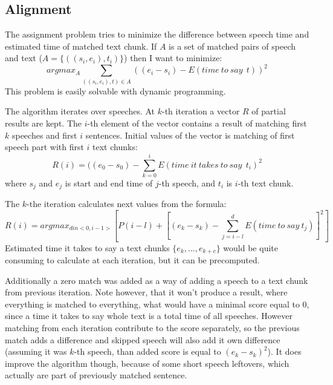 \documentclass[12pt,a4paper,english]{article}
\begin{document}
\newpage

\subsection{Alignment}

The assignment problem tries to minimize the difference between speech time and estimated time of matched text chunk.
If $A$ is a set of matched pairs of speech and text ($A = \{((s_i, e_i), t_i)\}$) then I want to minimize:
\begin{equation}
    argmax_A \sum_{((s_i, e_i), t) \in A} ((e_i - s_i) - E(time \: to \: say \: \: t))^2
\end{equation}
This problem is easily solvable with dynamic programming. \newline

The algorithm iterates over speeches. \newline
At $k$-th iteration a vector $R$ of partial results are kept. The $i$-th element of the vector contains a result of matching first $k$ speeches and first $i$ sentences. \newline
Initial values of the vector is matching of first speech part with first $i$ text chunks:
\begin{equation}
    R(i) = ((e_0 - s_0) - \sum_{k = 0}^i E(time \: it \: takes \: to \: say \: \: t_i)^2
\end{equation}
where $s_j$ and $e_j$ is start and end time of $j$-th speech, \newline
and $t_i$ is $i$-th text chunk. \newline
               
The $k$-the iteration calculates next values from the formula:
\begin{equation}
    R(i) = argmax_{d in <0, i - 1>} [P(i-l) + [(e_k - s_k) - \sum_{j = i - l}^d E(time \: to \: say \: t_j)]^2 ]
\end{equation}
Estimated time it takes to say a text chunks $\{e_k, ..., e_{k+c}\}$ would be quite consuming to calculate at each iteration, but it can be precomputed. \newline

Additionally a zero match was added as a way of adding a speech to a text chunk from previous iteration.  Note however, that it won't produce a result, where everything is matched to everything, what would have a minimal score equal to 0, since a time it takes to say whole text is a total time of all speeches. \newline
However matching from each iteration contribute to the score separately, so the previous match adds a difference and skipped speech will also add it own difference (assuming it was $k$-th speech, than added score is equal to $(e_k - s_k)^2$). \newline
It does improve the algorithm though, because of some short speech leftovers, which actually are part of previously matched sentence. \newline
\end{document}
